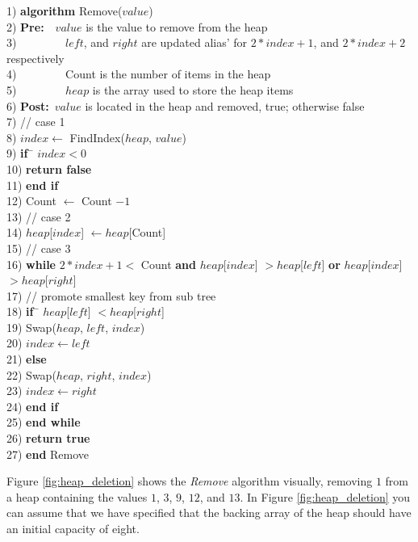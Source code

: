 \newpage
\begin{tabbing}
1)  \textbf{alg}\= \textbf{orithm} Remove($value$) \\
2)  \> \textbf{Pre:}~~$value$ is the value to remove from the heap \\
3)  \> ~~~~~~~~$left$, and $right$ are updated alias' for $2*index+1$, and $2*index+2 $ respectively \\
4)  \> ~~~~~~~~Count is the number of items in the heap \\
5)  \> ~~~~~~~~$heap$ is the array used to store the heap items \\
6)  \> \textbf{Post:}~$value$ is located in the heap and removed, true; otherwise false \\
7)  \> // case 1 \\
8)  \> $index \leftarrow$ FindIndex($heap$, $value$) \\
9)  \> \textbf{if}~\= $index < 0$ \\
10) \> \> \textbf{return false} \\
11) \> \textbf{end if} \\
12) \> Count $\leftarrow$ Count $ - 1$ \\
13) \> // case 2 \\
14) \> $heap$[$index$] $\leftarrow heap$[Count] \\
15) \> // case 3 \\
16) \> \textbf{while} $2 * index + 1 <$ Count \textbf{and} $heap$[$index$] $> heap$[$left$] \textbf{or} $heap$[$index$] $> heap$[$right$] \\
17) \> \> // promote smallest key from sub tree \\
18) \> \> \textbf{if}~\= $heap$[$left$] $< heap$[$right$] \\
19) \> \> \> Swap($heap$, $left$, $index$) \\
20) \> \> \> $index \leftarrow left$ \\
21) \> \> \textbf{else} \\
22) \> \> \> Swap($heap$, $right$, $index$) \\
23) \> \> \> $index \leftarrow right$ \\
24) \> \> \textbf{end if} \\
25) \> \textbf{end while} \\
26) \> \textbf{return true} \\
27) \textbf{end} Remove \\
\end{tabbing}

Figure \ref{fig:heap_deletion} shows the \textit{Remove} algorithm visually, removing $1$ from a heap containing the values $1$, $3$, $9$, $12$, and $13$. In Figure \ref{fig:heap_deletion} you can assume that we have specified that the backing array of the heap should have an initial capacity of eight.


